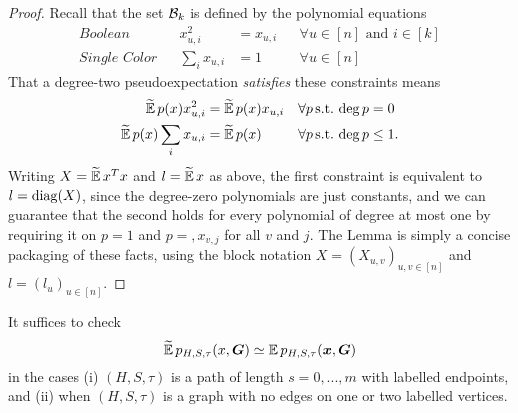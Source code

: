 \begin{proof}
    Recall that the set $\mathcal{B}_k$ is defined by the polynomial equations
    \begin{align*}
    	\textit{Boolean} & & x_{u,i}^2 &= x_{u,i} & &\forall u\in[n] \text{ and } i\in [k] \\
    	\textit{Single Color} & & \sum_i x_{u,i} &= 1 & &\forall u\in[n] 
    \end{align*}
    That a degree-two pseudoexpectation \textit{satisfies} these constraints means 
    \begin{align*}
        \widetilde{\operatorname*{\mathbb{E}}}\, p(x)x_{u,i}^2 &= \widetilde{\operatorname*{\mathbb{E}}}\, p(x) x_{u,i} & &\forall p \,\text{s.t.}\,\deg p = 0 \\
        \widetilde{\operatorname*{\mathbb{E}}}\, p(x)\sum_i x_{u,i} &= \widetilde{\operatorname*{\mathbb{E}}}\, p(x) & &\forall p \,\text{s.t.}\,\deg p \le 1. 
    \end{align*}
   Writing $X = \widetilde{\operatorname*{\mathbb{E}}}\, x^T x$ and $l = \widetilde{\operatorname*{\mathbb{E}}}\, x$ as above, the first constraint is equivalent to $l = \operatorname{diag}(X)$, since the degree-zero polynomials are just constants, and we can guarantee that the second holds for every polynomial of degree at most one by requiring it on $p = 1$ and $p= ,x_{v,j}$ for all $v$ and $j$. The Lemma is simply a concise packaging of these facts, using the block notation $X = (X_{u,v})_{u,v\in[n]}$ and $l = (l_u)_{u\in [n]}$.
\end{proof}

\begin{proposition} \label{prop:paths-suffice}
    It suffices to check
    $$
        \widetilde{\operatorname*{\mathbb{E}}}\, p_{H,S,\tau}(x,\boldsymbol{G}) \simeq \operatorname*{\mathbb{E}} p_{H,S,\tau}({\boldsymbol{x}},\boldsymbol{G})
    $$
    in the cases (i) $(H,S,\tau)$ is a path of length $s=0,...,m$ with labelled endpoints, and (ii) when $(H,S, \tau)$ is a graph with no edges on one or two labelled vertices.
\end{proposition}


